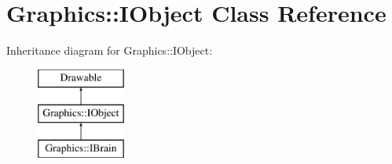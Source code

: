 \hypertarget{class_graphics_1_1_i_object}{}\section{Graphics\+:\+:I\+Object Class Reference}
\label{class_graphics_1_1_i_object}
Inheritance diagram for Graphics\+:\+:I\+Object\+:\begin{figure}[H]
\begin{center}
\leavevmode
\includegraphics[height=3.000000cm]{class_graphics_1_1_i_object}
\end{center}
\end{figure}

